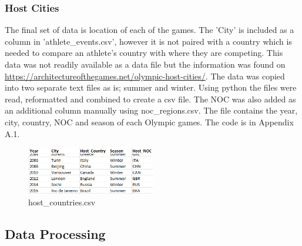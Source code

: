 \documentclass[a4 paper, 12pt]{article}
\begin{document}
    \subsubsection{Host Cities}
    The final set of data is location of each of the games. The 'City' is included as a column in 'athlete\_events.csv', however it is not paired with a country which is needed to compare an athlete's country with where they are competing. This data was not readily available as a data file but the information was found on \url{https://architectureofthegames.net/olympic-host-cities/}. The data was copied into two separate text files as is; summer and winter. Using python the files were read, reformatted and combined to create a csv file. The NOC was also added as an additional column manually using noc\_regions.csv. The file contains the year, city, country, NOC and season of each Olympic games. The code is in Appendix A.1.
        \begin{figure} [H]
            \centering
            \includegraphics[width=0.5\textwidth, frame]
            {./images/data/host_countries.png}  
            \caption{host\_countries.csv}                  
        \end{figure}  

\subsection{Data Processing}
\end{document}
